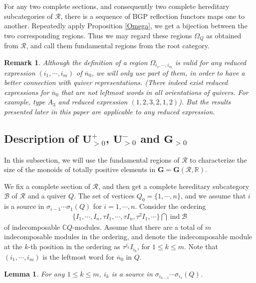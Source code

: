 \documentclass[12pt]{amsart}
\newtheorem{lemma}[theorem]{Lemma}
\newtheorem{remark}[theorem]{Remark}
\begin{document}
For any two complete sections, and consequently two complete hereditary subcategories of $\mathcal{R}$, there is a sequence of BGP reflection functors maps one to another. 
Repeatedly apply Proposition \ref{Omega}, we get a bijection between the two corresponding regions.
Thus we may regard these regions $\Omega_Q$ as obtained from $\mathcal{R}$, and call them fundamental regions from the root category.

\begin{remark}
    Although the definition of a region $\Omega_{i_1,\cdots,i_m}$ is valid for any reduced expression $(i_1,\cdots,i_m)$ of $\overline{n}_0$, we will only use part of them, in order to have a better connection with quiver representations. 
    (There indeed exist reduced expressions for $\overline{n}_0$ that are not leftmost words in all orientations of  quivers. For example, type $A_3$ and reduced expression $(1,2,3,2,1,2)$). 
    But the results presented later in this paper are applicable to any reduced expression.
\end{remark}



\subsection{Description of $\mathbf{U}^+_{>0}$, $\mathbf{U}^-_{>0}$ and $\mathbf{G}_{>0}$}

In this subsection, we will use the fundamental regions of $\mathcal{R}$ to characterize the size of the monoids of  totally positive elements in $\mathbf{G}=\mathbf{G}(\mathcal{R},\mathbb{R})$.

We fix a complete section of $\mathcal{R}$, and then get a complete hereditary subcategory $\mathcal{B}$ of $\mathcal{R}$ and a quiver $Q$. 
The set of vertices $Q_0=\{1,\cdots,n\}$, and we assume that $i$ is a source in $\sigma_{i-1}\cdots\sigma_1(Q)$ for $i=1,\cdots,n$.
Consider the ordering 
\begin{align*}
  \{  I_1,\cdots,I_n,\tau I_1,\cdots ,\tau I_n, \tau^2 I_1, \cdots \}\bigcap \operatorname{ind}\mathcal{B}
\end{align*}
of indecomposable $\mathbb{C}Q$-modules.
Assume that there are a total of $m$ indecomposable modules in the ordering, and denote the indecomposable module at the $k$-th position in the ordering as $\tau^{j_k}I_{i_k}$, for $1\leq k\leq m$.
Note that $(i_1,\cdots,i_m)$ is the leftmost word for $\overline{n}_0$ in $Q$.

\begin{lemma}
    For any $1\leq k\leq m$, $i_k$ is a source in $\sigma_{i_{k-1}}\cdots\sigma_{i_1}(Q)$.
\end{lemma}
\end{document}
